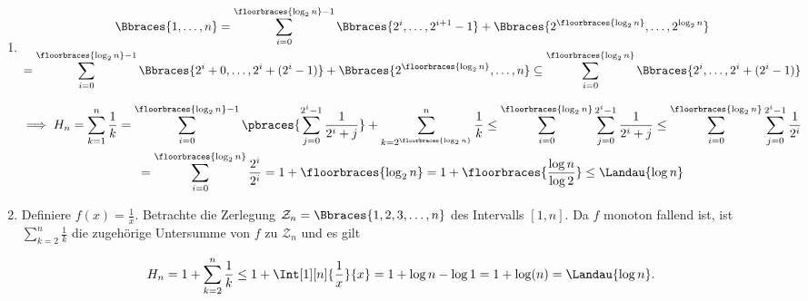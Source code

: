 \begin{solution}

\phantom{}

\begin{enumerate}

  \item

  \begin{multline*}
    \Bbraces{1, \dots, n}
    =
    \sum_{i=0}^{\floorbraces{\log_2{n}} - 1}
    \Bbraces{2^i, \dots, 2^{i+1} - 1}
    +
    \Bbraces{2^{\floorbraces{\log_2{n}}}, \dots, 2^{\log_2{n}}} \\
    =
    \sum_{i=0}^{\floorbraces{\log_2{n}} - 1}
    \Bbraces{2^i + 0, \dots, 2^i + (2^i - 1)}
    +
    \Bbraces{2^{\floorbraces{\log_2{n}}}, \dots, n}
    \subseteq
    \sum_{i=0}^{\floorbraces{\log_2{n}}}
    \Bbraces{2^i, \dots, 2^i + (2^i - 1)}
  \end{multline*}

  \begin{multline*}
    \implies
    H_n
    =
    \sum_{k=1}^n \frac{1}{k}
    =
    \sum_{i=0}^{\floorbraces{\log_2{n}} - 1}
    \pbraces
    {
      \sum_{j=0}^{2^i - 1}
      \frac{1}{2^i + j}
    }
    +
    \sum_{k = 2^\floorbraces{\log_2{n}}}^n
    \frac{1}{k}
    \leq
    \sum_{i=0}^{\floorbraces{\log_2{n}}}
    \sum_{j=0}^{2^i - 1}
    \frac{1}{2^i + j}
    \leq
    \sum_{i=0}^{\floorbraces{\log_2{n}}}
    \sum_{j=0}^{2^i - 1}
    \frac{1}{2^i} \\
    =
    \sum_{i=0}^{\floorbraces{\log_2{n}}}
    \frac{2^i}{2^i}
    =
    1 + \floorbraces{\log_2{n}}
    =
    1 + \floorbraces{\frac{\log{n}}{\log{2}}}
    \leq
    \Landau{\log{n}}
  \end{multline*}

  \item

  Definiere $f(x) = \frac{1}{x}$. Betrachte die Zerlegung $\mathcal{Z}_n = \Bbraces{1, 2, 3, \dots, n}$ des Intervalls $[1, n]$.
  Da $f$ monoton fallend ist, ist $\sum_{k=2}^n\frac{1}{k}$ die zugehörige Untersumme von $f$ zu $\mathcal{Z}_n$ und es gilt

  \begin{align*}
    H_n
    =
    1 + \sum_{k=2}^n \frac{1}{k}
    \leq
    1 + \Int[1][n]{\frac{1}{x}}{x}
    =
    1 + \log{n} - \log{1} = 1 + \log(n)
    =
    \Landau{\log{n}}.
  \end{align*}

\end{enumerate}

\end{solution}

